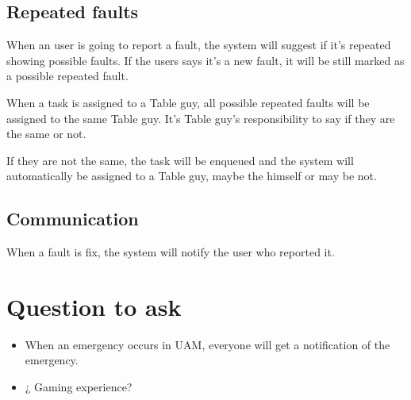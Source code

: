 \documentclass[nobuilddate,nochap]{apuntes}
\newcommand{\tbg}{Table guy}
\newcommand{\tbg}{Table guys}
\begin{document}
\subsection{Repeated faults}
When an user is going to report a fault, the system will suggest if it's repeated showing possible faults. If the users says it's a new fault, it will be still marked as a possible repeated fault.

When a task is assigned to a \tbg, all possible repeated faults will be assigned to the same \tbg. It's \tbg's responsibility to say if they are the same or not.

If they are not the same, the task will be enqueued and the system will automatically be assigned to a \tbg, maybe the himself or may be not.


\subsection{Communication}

When a fault is fix, the system will notify the user who reported it.

\section{Question to ask}

\begin{itemize}
\item When an emergency occurs in UAM, everyone will get a notification  of the emergency. 
\item ¿ Gaming experience?
\end{itemize}


 
\end{document}
